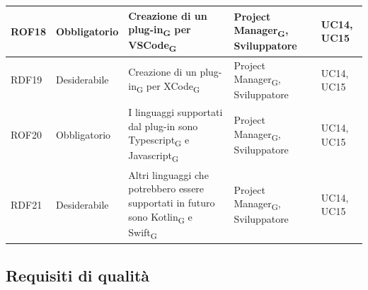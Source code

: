 \documentclass{article}
\begin{document}
\begin{center}
\begin{tabular}{|p{2cm}|p{3cm}|p{6cm}|p{3cm}|p{2cm}|}
\hline
\rowcolor{LightBlue}
ROF18&Obbligatorio & Creazione di un plug-in\textsubscript{G} per VSCode\textsubscript{G}& Project Manager\textsubscript{G}, Sviluppatore& UC14, UC15\\
\hline
\rowcolor{LighterBlue}
RDF19&Desiderabile & Creazione di un plug-in\textsubscript{G} per XCode\textsubscript{G}& Project Manager\textsubscript{G}, Sviluppatore& UC14, UC15\\
\hline
\rowcolor{LightBlue}
ROF20&Obbligatorio & I linguaggi supportati dal plug-in sono Typescript\textsubscript{G} e Javascript\textsubscript{G}& Project Manager\textsubscript{G}, Sviluppatore &UC14, UC15\\
\hline
\rowcolor{LighterBlue}
RDF21&Desiderabile & Altri linguaggi che potrebbero essere supportati in futuro sono Kotlin\textsubscript{G} e Swift\textsubscript{G}& Project Manager\textsubscript{G}, Sviluppatore &UC14, UC15\\
\hline

\end{tabular}
\label{tab:reqfunz}
\end{center}

\subsection{Requisiti di qualità}
\end{document}
